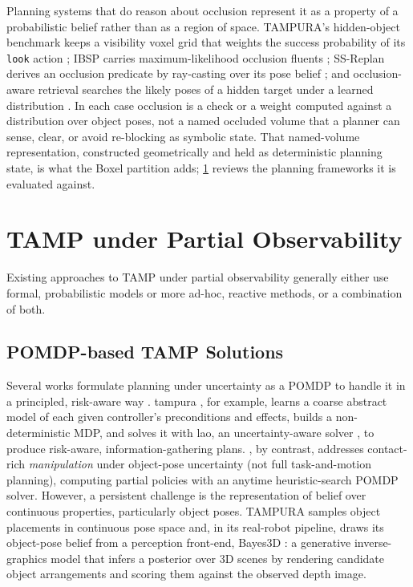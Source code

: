 Planning systems that do reason about occlusion represent it as a property of a probabilistic belief rather than as a region of space. TAMPURA's hidden-object benchmark keeps a visibility voxel grid that weights the success probability of its \texttt{look} action \cite{curtis2024partially}; IBSP carries maximum-likelihood occlusion fluents \cite{hadfield2015modular}; SS-Replan derives an occlusion predicate by ray-casting over its pose belief \cite{garrett2020online}; and occlusion-aware retrieval searches the likely poses of a hidden target under a learned distribution \cite{bejjani2021occlusion}. In each case occlusion is a check or a weight computed against a distribution over object poses, not a named occluded volume that a planner can sense, clear, or avoid re-blocking as symbolic state. That named-volume representation, constructed geometrically and held as deterministic planning state, is what the Boxel partition adds; \cref{sec:rw-potamp} reviews the planning frameworks it is evaluated against.

\section{TAMP under Partial Observability}
\label{sec:rw-potamp}
Existing approaches to TAMP under partial observability generally either use formal, probabilistic models or more ad-hoc, reactive methods, or a combination of both.

\subsection{POMDP-based TAMP Solutions}
Several works formulate planning under uncertainty as a POMDP to handle it in a principled, risk-aware way \cite{curtis2024partially, saleem2024pomdp}. \Ac{tampura} \cite{curtis2024partially}, for example, learns a coarse abstract model of each given controller's preconditions and effects, builds a non-deterministic MDP, and solves it with \ac{lao}, an uncertainty-aware solver \cite{hansen2001lao}, to produce risk-aware, information-gathering plans. \cite{saleem2024pomdp}, by contrast, addresses contact-rich \emph{manipulation} under object-pose uncertainty (not full task-and-motion planning), computing partial policies with an anytime heuristic-search POMDP solver.
However, a persistent challenge is the representation of belief over continuous properties, particularly object poses. TAMPURA \cite{curtis2024partially} samples object placements in continuous pose space and, in its real-robot pipeline, draws its object-pose belief from a perception front-end, Bayes3D \cite{gothoskar2023bayes3d}: a generative inverse-graphics model that infers a posterior over 3D scenes by rendering candidate object arrangements and scoring them against the observed depth image.

